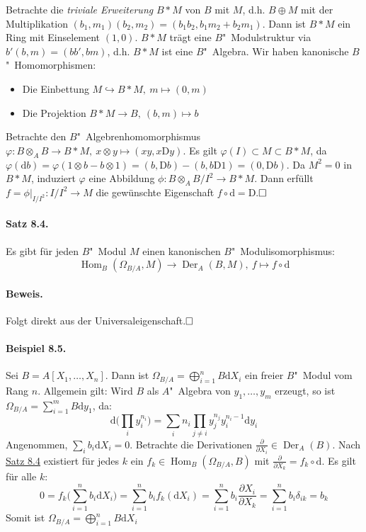 \documentclass[11pt,b5paper,openany]{memoir}
\def \qed {$\hfill\square$}
\begin{document}
Betrachte die \textit{triviale Erweiterung} $B\ast M$ von $B$ mit $M$, d.h. $B\oplus M$ mit der Multiplikation $(b_1,m_1)(b_2,m_2)=(b_1b_2,b_1m_2+b_2m_1)$. Dann ist $B\ast M$ ein Ring mit Einselement $(1,0)$. $B\ast M$ trägt eine $B$"~Modulstruktur via $b'(b,m)=(bb',bm)$, d.h. $B\ast M$ ist eine $B$"~Algebra. Wir haben kanonische $B$"~Homomorphismen:
\begin{itemize}
\item Die Einbettung $M\hookrightarrow B\ast M,\ m\mapsto (0,m)$
\item Die Projektion $B\ast M\to B,\ (b,m)\mapsto b$
\end{itemize}
Betrachte den $B$"~Algebrenhomomorphismus $\varphi:B\otimes_AB\to B\ast M,\ x\otimes y\mapsto (xy,x\mathrm{D}y)$. Es gilt $\varphi(I)\subset M\subset B\ast M$, da $\varphi(\mathrm{d}b)=\varphi(1\otimes b- b\otimes 1)=(b,\mathrm{D}b)-(b,b\mathrm{D}1)=(0,\mathrm{D}b)$. Da $M^2=0$ in $B\ast M$, induziert $\varphi$ eine Abbildung $\phi: B\otimes_A B/I^2\to B\ast M$. Dann erfüllt $f=\phi|_{I/I^2}:I/I^2\to M$ die gewünschte Eigenschaft $f\circ\mathrm{d}=\mathrm{D}$.\qed

\paragraph{Satz 8.4.}\label{8.4} Es gibt für jeden $B$"~Modul $M$ einen kanonischen $B$"~Modulisomorphismus:
\[\operatorname{Hom}_B(\Omega_{B/A},M)\to\operatorname{Der}_A(B,M),\ f\mapsto f\circ\mathrm{d} \]

\paragraph{Beweis.} Folgt direkt aus der Universaleigenschaft.\qed

\paragraph{Beispiel 8.5.}\label{8.5} Sei $B=A[X_1,\ldots,X_n]$. Dann ist $\Omega_{B/A}=\bigoplus_{i=1}^n B\mathrm{d}X_i$ ein freier $B$"~Modul vom Rang $n$. Allgemein gilt: Wird $B$ als $A$"~Algebra von $y_1,\ldots,y_m$ erzeugt, so ist $\Omega_{B/A}=\sum_{i=1}^m B\mathrm{d}y_1$, da:
\[\mathrm{d}\Big(\prod_i y_i^{n_i}\Big) = \sum_i n_i\prod_{j\neq i} y_j^{n_j}y_i^{n_i - 1}\mathrm{d}y_i \]
Angenommen, $\sum_i b_i\mathrm{d}X_i=0$. Betrachte die Derivationen $\frac{\partial}{\partial X_i}\in\operatorname{Der}_A(B)$. Nach \hyperref[8.4]{Satz 8.4} existiert für jedes $k$ ein $f_k\in\operatorname{Hom}_B(\Omega_{B/A},B)$ mit $\frac{\partial}{\partial X_k}=f_k\circ\mathrm{d}$. Es gilt für alle $k$:
\[ 0= f_k\Big(\sum_{i=1}^n b_i\mathrm{d}X_i\Big)= \sum_{i=1}^n b_i f_k(\mathrm{d}X_i) = \sum_{i=1}^n b_i \frac{\partial X_i}{\partial X_k} = \sum_{i=1}^n b_i\delta_{ik}=b_k \]
Somit ist $\Omega_{B/A}=\bigoplus_{i=1}^nB\mathrm{d}X_i$
\end{document}
